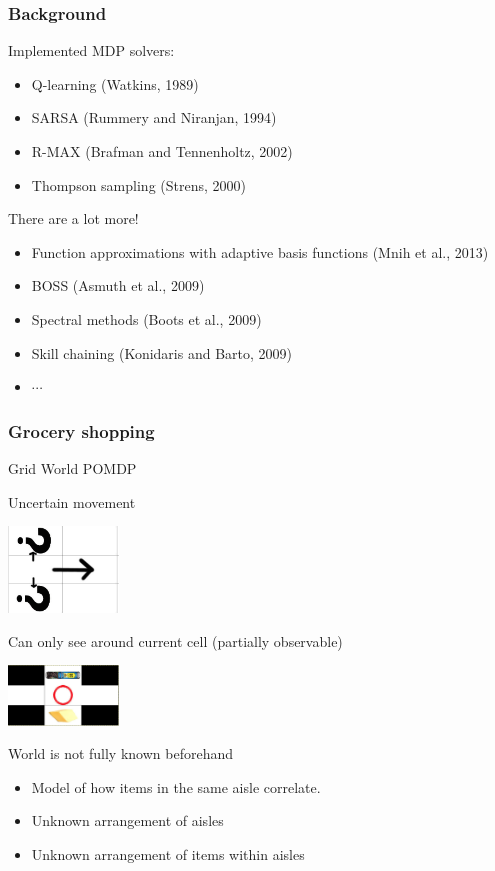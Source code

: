 \documentclass[10pt, compress]{beamer}
\begin{document}
\begin{frame}[fragile]
  \frametitle{Background}

  Implemented MDP solvers:
  \begin{itemize}
  \item Q-learning \alert{(Watkins, 1989)}
  \item SARSA \alert{(Rummery and Niranjan, 1994)}
  \item R-MAX \alert{(Brafman and Tennenholtz, 2002)}
  \item Thompson sampling \alert{(Strens, 2000)}
  \end{itemize}

  There are a lot more!
  \begin{itemize}
  \item Function approximations with adaptive basis functions \alert{(Mnih et
  al., 2013)}
  \item BOSS \alert{(Asmuth et al., 2009)}
  \item Spectral methods \alert{(Boots et al., 2009)}
  \item Skill chaining \alert{(Konidaris and Barto, 2009)}
  \item $\cdots$
  \end{itemize}

\end{frame}

\begin{frame}[fragile]
  \frametitle{Grocery shopping}

  Grid World POMDP

  Uncertain movement

  \centerline{\includegraphics[width=0.22\textwidth]{img/uncertain_transition.png}}

  Can only see around current cell (partially observable)

  \centerline{\includegraphics[width=0.22\textwidth]{img/partial_obs.png}}

  World is not fully known beforehand
  \begin{itemize}
  \item Model of how items in the same aisle correlate.
  \item Unknown arrangement of aisles
  \item Unknown arrangement of items within aisles
  \end{itemize}
\end{frame}
\end{document}
